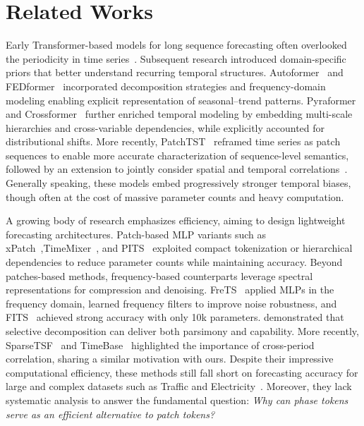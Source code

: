 \section{Related Works}


Early Transformer-based models for long sequence forecasting often overlooked the periodicity in time series~\citep{zhou2021informer, logtrans2019}. 
Subsequent research introduced domain-specific priors that better understand recurring temporal structures. 
Autoformer~\citep{wu2021autoformer} and FEDformer~\citep{zhou2022fedformer} incorporated decomposition strategies and frequency-domain modeling enabling explicit representation of seasonal–trend patterns. 
Pyraformer~\citep{liu2021pyraformer} and Crossformer~\citep{zhang2023crossformer} further enriched temporal modeling by embedding multi-scale hierarchies and cross-variable dependencies, while \cite{nonstationarytrans2022} explicitly accounted for distributional shifts. 
More recently, PatchTST~\citep{nie2023patchtst} reframed time series as patch sequences to enable more accurate characterization of sequence-level semantics, followed by an extension to jointly consider spatial and temporal correlations~\citep{ctpatchtst2025}. Generally speaking, these models embed progressively stronger temporal biases, though often at the cost of massive parameter counts and heavy computation.

A growing body of research emphasizes efficiency, aiming to design lightweight forecasting architectures. 
Patch-based MLP variants such as xPatch~\citep{xpatch2025},TimeMixer~\citep{timemixer24}, and PITS~\citep{PITS2024} exploited compact tokenization or hierarchical dependencies to reduce parameter counts while maintaining accuracy. 
Beyond patches-based methods, frequency-based counterparts leverage spectral representations for compression and denoising.
FreTS~\citep{FreTS2023} applied MLPs in the frequency domain, \cite{filternet2024} learned frequency filters to improve noise robustness, and FITS~\citep{fits2024} achieved strong accuracy with only 10k parameters. 
\cite{deng2024parsimony} demonstrated that selective decomposition can deliver both parsimony and capability.
More recently, SparseTSF~\citep{lin2024sparsetsf} and TimeBase~\citep{huang2025timebase} highlighted the importance of cross-period correlation, sharing a similar motivation with ours.
Despite their impressive computational efficiency, these methods still fall short on forecasting accuracy for large and complex datasets such as Traffic and Electricity~\citep{lin2024sparsetsf, huang2025timebase}. 
Moreover, they lack systematic analysis to answer the fundamental question: \emph{Why can phase tokens serve as an efficient alternative to patch tokens?}
